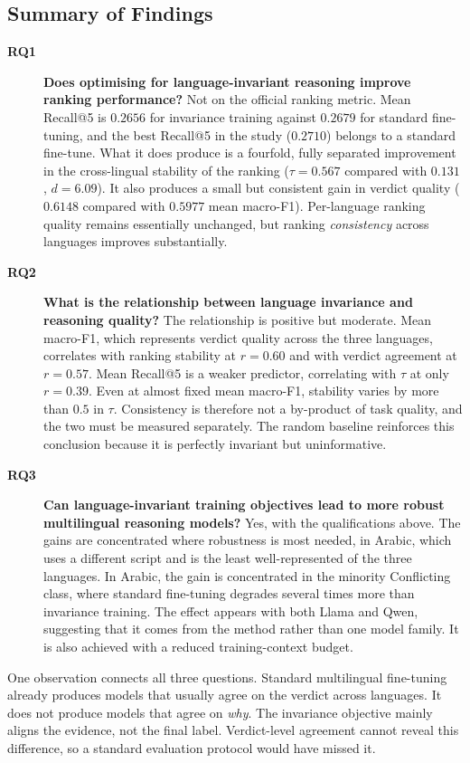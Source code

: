 \subsection{Summary of Findings}
\label{subsec:res-summary}

\begin{description}
\item[\textbf{RQ1}] \textbf{Does optimising for language-invariant reasoning improve ranking
performance?} Not on the official ranking metric. Mean
Recall@5 is $0.2656$ for invariance training against $0.2679$ for standard fine-tuning, and the best
Recall@5 in the study ($0.2710$) belongs to a standard fine-tune. What it does produce is a fourfold,
fully separated improvement in the cross-lingual stability of the ranking
($\tau = 0.567$ compared with $0.131$, $d = 6.09$). It also produces a small but consistent gain in
verdict quality ($0.6148$ compared with $0.5977$ mean macro-F1). Per-language ranking quality remains
essentially unchanged, but ranking \emph{consistency} across languages improves substantially.

\item[\textbf{RQ2}] \textbf{What is the relationship between language invariance and reasoning
quality?} The relationship is positive but moderate. Mean macro-F1, which represents verdict quality across the
three languages, correlates with ranking stability at $r=0.60$ and with verdict agreement at $r=0.57$.
Mean Recall@5 is a weaker predictor, correlating with $\tau$ at only $r=0.39$. Even at almost fixed
mean macro-F1, stability varies by more than $0.5$ in $\tau$. Consistency is therefore not a
by-product of task quality, and the two must be measured separately. The random baseline reinforces
this conclusion because it is perfectly invariant but uninformative.

\item[\textbf{RQ3}] \textbf{Can language-invariant training objectives lead to more robust
multilingual reasoning models?} Yes, with the qualifications above. The gains are concentrated where
robustness is most needed,
in Arabic, which uses a different script and is the least well-represented of the three languages. In
Arabic, the gain is concentrated in the minority \textsf{Conflicting} class, where standard
fine-tuning degrades several times more than invariance training. The effect appears with both Llama
and Qwen, suggesting that it comes from the method rather than one model family. It is also achieved
with a reduced training-context budget.
\end{description}

One observation connects all three questions. Standard multilingual fine-tuning already produces
models that usually agree on the verdict across languages. It does not produce models that agree on
\emph{why}. The invariance objective mainly aligns the evidence, not the final label. Verdict-level
agreement cannot reveal this difference, so a standard evaluation protocol would have missed it.
